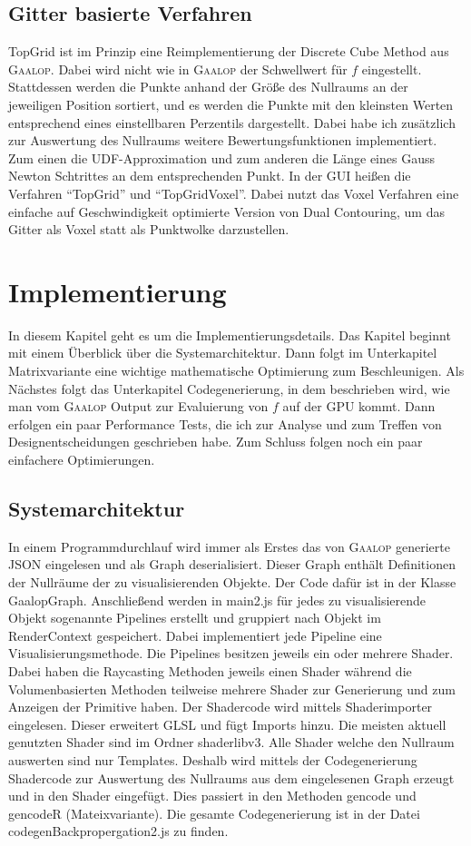 \documentclass[
	ngerman,%
	accentcolor=9c,%
	ruledheaders=section,%
	class=report,%
	thesis={type=bachelor},%
	fontsize=11pt,%
	parskip=half-,%
	custommargins=true,%
	marginpar=false,%
]{tudapub}
\begin{document}
\section{Gitter basierte Verfahren}
TopGrid ist im Prinzip eine Reimplementierung der Discrete Cube Method aus \textsc{Gaalop}. Dabei wird nicht wie in \textsc{Gaalop} der Schwellwert für \(f\) eingestellt. Stattdessen werden die Punkte anhand der Größe des Nullraums an der jeweiligen Position sortiert, und es werden die Punkte mit den kleinsten Werten entsprechend eines einstellbaren Perzentils dargestellt.
Dabei habe ich zusätzlich zur Auswertung des Nullraums weitere Bewertungsfunktionen implementiert. Zum einen die UDF-Approximation und zum anderen die Länge eines Gauss Newton Schtrittes an dem entsprechenden Punkt.
In der GUI heißen die Verfahren \enquote{TopGrid} und \enquote{TopGridVoxel}. 
Dabei nutzt das Voxel Verfahren eine einfache auf Geschwindigkeit optimierte Version von Dual Contouring, um das Gitter als Voxel statt als Punktwolke darzustellen. 



\chapter{Implementierung}
In diesem Kapitel geht es um die Implementierungsdetails.
Das Kapitel beginnt mit einem Überblick über die Systemarchitektur. Dann folgt im Unterkapitel Matrixvariante eine wichtige mathematische Optimierung zum Beschleunigen. Als Nächstes folgt das Unterkapitel Codegenerierung, in dem beschrieben wird, wie man vom \textsc{Gaalop} Output zur Evaluierung von \(f\) auf der GPU kommt. Dann erfolgen ein paar Performance Tests, die ich zur Analyse und zum Treffen von Designentscheidungen geschrieben habe.
Zum Schluss folgen noch ein paar einfachere Optimierungen.
\section{Systemarchitektur}
In einem Programmdurchlauf wird immer als Erstes das von \textsc{Gaalop} generierte JSON eingelesen und als Graph deserialisiert. Dieser Graph enthält Definitionen der Nullräume der zu visualisierenden Objekte. Der Code dafür ist in der Klasse GaalopGraph.
Anschließend werden in main2.js für jedes zu visualisierende Objekt sogenannte Pipelines erstellt und gruppiert nach Objekt im RenderContext gespeichert. Dabei implementiert jede Pipeline eine Visualisierungsmethode. Die Pipelines besitzen jeweils ein oder mehrere Shader. Dabei haben die Raycasting Methoden jeweils einen Shader während die Volumenbasierten Methoden teilweise mehrere Shader zur Generierung und zum Anzeigen der Primitive haben.  
Der Shadercode wird mittels Shaderimporter eingelesen. Dieser erweitert GLSL und fügt Imports hinzu. Die meisten aktuell genutzten Shader sind im Ordner shaderlibv3.
Alle Shader welche den Nullraum auswerten sind nur Templates. Deshalb wird mittels der Codegenerierung Shadercode zur Auswertung des Nullraums aus dem eingelesenen Graph erzeugt und in den Shader eingefügt. Dies passiert in den Methoden gencode und gencodeR (Mateixvariante). Die gesamte Codegenerierung ist in der Datei codegenBackpropergation2.js zu finden.
\end{document}
